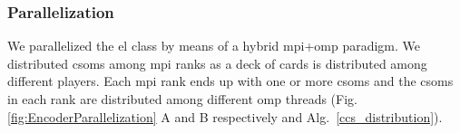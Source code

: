 \documentclass[11pt,a4paper]{article}
\begin{document}
\subsubsection{ Parallelization}

We parallelized the \gls{el} class by means of a hybrid \gls{mpi}+\gls{omp} paradigm. We distributed \glspl{csom} among \gls{mpi} ranks as a deck of cards is distributed among different players. Each \gls{mpi} rank ends up with one or more \glspl{csom} and the \glspl{csom} in each rank are distributed among different \gls{omp} threads (Fig. \ref{fig:EncoderParallelization} A and B respectively and Alg.~\ref{ccs_distribution}).

\begin{algorithm}
	\caption{This algorithm distributes \glspl{cc} among \gls{mpi} processes in a distributed memory system and the \glspl{cc} in each process are distributed among \gls{omp} threads in a shared memory system. In this algorithm we run one \gls{mpi} process per compute node on Cooley.}
\label{ccs_distribution}
\begin{algorithmic}[1]
	\ENDFOR
\end{algorithmic}
\end{algorithm}
\end{document}

